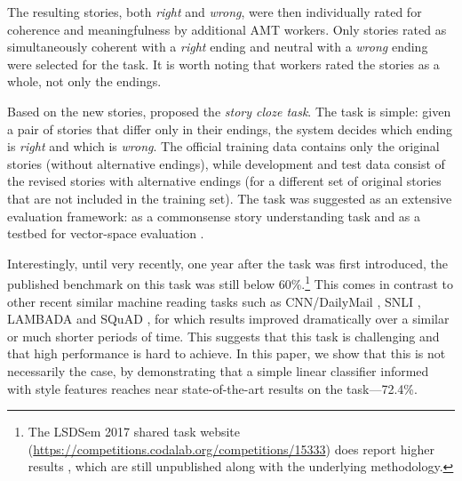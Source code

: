 \documentclass[11pt,a4paper]{article}
\newcommand{\com}[1]{}
\newcommand{\resolved}[1]{}
\newcommand{\roy}[1]{{\color{orange}\textsc{[#1 --rs]}}}
\newcommand{\yc}[1]{{\color{bblue}\{\textit{#1}\}$_{yc}$}}
\newcommand{\nascomment}[1]{{\color{blue}\textsc{[#1 --nas]}}}
\renewcommand{\roy}[1]{{\color{orange}[#1 --rs]}}
\renewcommand{\roy}[1]{#1}
\renewcommand{\nascomment}[1]{}
\renewcommand{\yc}[1]{}
\begin{document}
The resulting stories, both {\it right} and {\it wrong}, were then individually rated for coherence and meaningfulness by additional AMT workers.
Only stories rated as simultaneously coherent with a {\it right} ending and neutral with a {\it wrong} ending were selected for the task. 
It is worth noting that workers rated the stories as a whole, not only the endings.

Based on the new stories, \citet{Mostafazadeh:2016} proposed the {\it story cloze task}. 
The task is simple:  given a pair of stories that differ only in their endings, the system decides which ending is {\it right} and which is {\it wrong}. 
The official training data contains only the original stories (without alternative endings), while development and test data consist of the revised stories with alternative endings (for a different set of original stories that are not included in the training set).\resolved{\roy{added {\it not} here}}
The task was suggested as an extensive evaluation framework:
as a commonsense story understanding task\com{, 
as the shared task for the  Linking Models of Lexical, Sentential and Discourse-level Semantics workshop (LSDSem 2017),} and as a testbed for vector-space evaluation \cite{mostafazadeh2016story}.

Interestingly, \roy{until very recently, one year after the task was first introduced, the published benchmark on this task was still below 60\%}\com{at the time of this submission, 10 months after the
task was first introduced, the published benchmark on this task is still below 60\% \cite{Salle:2016}}.\footnote{The LSDSem 2017 shared
  task website
  (\url{https://competitions.codalab.org/competitions/15333}) does
  report higher results%
\resolved{\roy{Tricky. Which number should we report here? leave empty?}
\nascomment{leave empty for now}}, which
are still unpublished along with the underlying methodology.}
This comes in contrast to other recent similar machine reading tasks such as CNN/DailyMail \cite{hermann2015teaching}, SNLI \cite{bowman2015large}, LAMBADA \cite{Paperno:2016} and SQuAD \cite{rajpurkar2016squad}, for which results improved dramatically over a similar or much shorter periods of time. This suggests that this task is challenging and that high performance is hard to achieve.
\roy{In this paper, we show that this is not necessarily the case, by demonstrating that a simple linear classifier informed with style features reaches near state-of-the-art results on the task---72.4\%.}
 \resolved{\yc{SQuAD was officially published in Nov 2016. by the time the official EMNLP talk was presented, the leaderboard performance (still unpublished) was  30\% beyond the best results in the paper. Given that, the statement of this paragraph seems a bit of overkill...?} \nascomment{it sounds like Yejin is saying that on squad, there was an even faster acceleration?  or that we should change ``similar period of time'' to ``similar or shorter period of time''?}}
\end{document}
